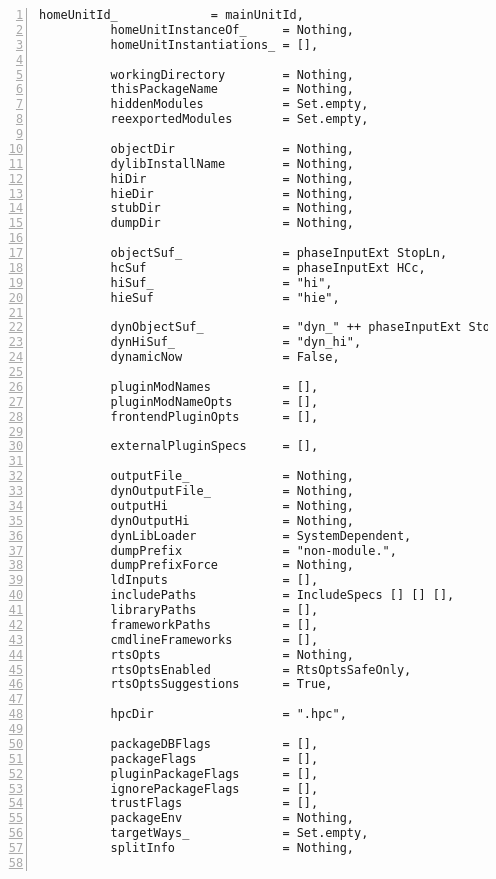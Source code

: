 \documentclass[en]{pracamgr}
\begin{document}
\begin{lstlisting}[numbers=left,stepnumber=1]
          homeUnitId_             = mainUnitId,
          homeUnitInstanceOf_     = Nothing,
          homeUnitInstantiations_ = [],
  
          workingDirectory        = Nothing,
          thisPackageName         = Nothing,
          hiddenModules           = Set.empty,
          reexportedModules       = Set.empty,
  
          objectDir               = Nothing,
          dylibInstallName        = Nothing,
          hiDir                   = Nothing,
          hieDir                  = Nothing,
          stubDir                 = Nothing,
          dumpDir                 = Nothing,
  
          objectSuf_              = phaseInputExt StopLn,
          hcSuf                   = phaseInputExt HCc,
          hiSuf_                  = "hi",
          hieSuf                  = "hie",
  
          dynObjectSuf_           = "dyn_" ++ phaseInputExt StopLn,
          dynHiSuf_               = "dyn_hi",
          dynamicNow              = False,
  
          pluginModNames          = [],
          pluginModNameOpts       = [],
          frontendPluginOpts      = [],
  
          externalPluginSpecs     = [],
  
          outputFile_             = Nothing,
          dynOutputFile_          = Nothing,
          outputHi                = Nothing,
          dynOutputHi             = Nothing,
          dynLibLoader            = SystemDependent,
          dumpPrefix              = "non-module.",
          dumpPrefixForce         = Nothing,
          ldInputs                = [],
          includePaths            = IncludeSpecs [] [] [],
          libraryPaths            = [],
          frameworkPaths          = [],
          cmdlineFrameworks       = [],
          rtsOpts                 = Nothing,
          rtsOptsEnabled          = RtsOptsSafeOnly,
          rtsOptsSuggestions      = True,
  
          hpcDir                  = ".hpc",
  
          packageDBFlags          = [],
          packageFlags            = [],
          pluginPackageFlags      = [],
          ignorePackageFlags      = [],
          trustFlags              = [],
          packageEnv              = Nothing,
          targetWays_             = Set.empty,
          splitInfo               = Nothing,
  

\end{lstlisting}
\end{document}
